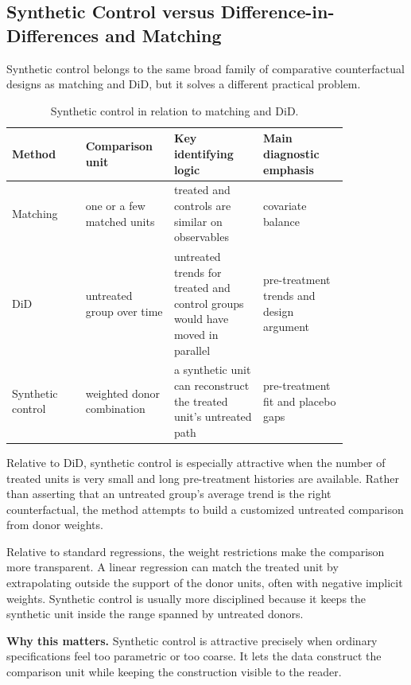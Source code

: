 \subsection{Synthetic Control versus Difference-in-Differences and Matching}
Synthetic control belongs to the same broad family of comparative counterfactual designs as matching and \ac{DiD}, but it solves a different practical problem.

\begin{table}[h]
\centering
\small
\begin{tabular}{p{0.19\linewidth}p{0.20\linewidth}p{0.23\linewidth}p{0.22\linewidth}}
\toprule
Method & Comparison unit & Key identifying logic & Main diagnostic emphasis \\
\midrule
Matching & one or a few matched units & treated and controls are similar on observables & covariate balance \\
\ac{DiD} & untreated group over time & untreated trends for treated and control groups would have moved in parallel & pre-treatment trends and design argument \\
Synthetic control & weighted donor combination & a synthetic unit can reconstruct the treated unit's untreated path & pre-treatment fit and placebo gaps \\
\bottomrule
\end{tabular}
\caption{Synthetic control in relation to matching and \ac{DiD}.}
\label{tab:sc_compare_methods}
\end{table}

Relative to \ac{DiD}, synthetic control is especially attractive when the number of treated units is very small and long pre-treatment histories are available. Rather than asserting that an untreated group's average trend is the right counterfactual, the method attempts to build a customized untreated comparison from donor weights.

Relative to standard regressions, the weight restrictions make the comparison more transparent. A linear regression can match the treated unit by extrapolating outside the support of the donor units, often with negative implicit weights. Synthetic control is usually more disciplined because it keeps the synthetic unit inside the range spanned by untreated donors.

\begin{boxD}
\textbf{Why this matters.}
Synthetic control is attractive precisely when ordinary specifications feel too parametric or too coarse. It lets the data construct the comparison unit while keeping the construction visible to the reader.
\end{boxD}

